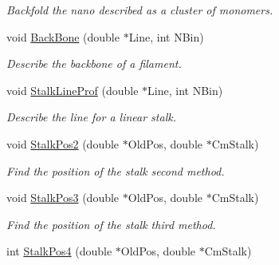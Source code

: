 \begin{DoxyCompactItemize}
\begin{DoxyCompactList}\small\item\em Backfold the nano described as a cluster of monomers. \end{DoxyCompactList}\item 
void \hyperlink{classVarData_abe9b658d50575d5d6be580bc87f3b4ac}{Back\+Bone} (double $\ast$Line, int N\+Bin)\hypertarget{classVarData_abe9b658d50575d5d6be580bc87f3b4ac}{}\label{classVarData_abe9b658d50575d5d6be580bc87f3b4ac}

\begin{DoxyCompactList}\small\item\em Describe the backbone of a filament. \end{DoxyCompactList}\item 
void \hyperlink{classVarData_af1b41051cede003baf90d8a7bf49ca8d}{Stalk\+Line\+Prof} (double $\ast$Line, int N\+Bin)\hypertarget{classVarData_af1b41051cede003baf90d8a7bf49ca8d}{}\label{classVarData_af1b41051cede003baf90d8a7bf49ca8d}

\begin{DoxyCompactList}\small\item\em Describe the line for a linear stalk. \end{DoxyCompactList}\item 
void \hyperlink{classVarData_a27d73648f0e3e381a832e8e9002a3bd6}{Stalk\+Pos2} (double $\ast$Old\+Pos, double $\ast$Cm\+Stalk)\hypertarget{classVarData_a27d73648f0e3e381a832e8e9002a3bd6}{}\label{classVarData_a27d73648f0e3e381a832e8e9002a3bd6}

\begin{DoxyCompactList}\small\item\em Find the position of the stalk second method. \end{DoxyCompactList}\item 
void \hyperlink{classVarData_aa2acae864359003a4b752ed363262f14}{Stalk\+Pos3} (double $\ast$Old\+Pos, double $\ast$Cm\+Stalk)\hypertarget{classVarData_aa2acae864359003a4b752ed363262f14}{}\label{classVarData_aa2acae864359003a4b752ed363262f14}

\begin{DoxyCompactList}\small\item\em Find the position of the stalk third method. \end{DoxyCompactList}\item 
int \hyperlink{classVarData_a57ab5d38a7d7936277859f39a525edb4}{Stalk\+Pos4} (double $\ast$Old\+Pos, double $\ast$Cm\+Stalk)\hypertarget{classVarData_a57ab5d38a7d7936277859f39a525edb4}{}\label{classVarData_a57ab5d38a7d7936277859f39a525edb4}


\end{DoxyCompactItemize}
